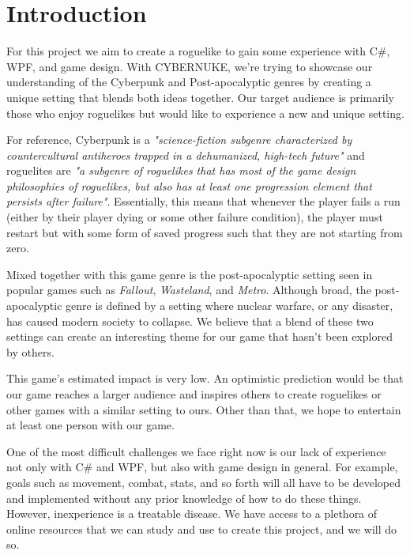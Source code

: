 \documentclass[10pt,conference,onecolumn,compsoc]{IEEEtran}
\begin{document}
\IEEEdisplaynontitleabstractindextext
\IEEEpeerreviewmaketitle



\section{Introduction}

For this project we aim to create a roguelike to gain some experience with C\#, WPF, and game design. With CYBERNUKE, we're trying to showcase our understanding of the Cyberpunk and Post-apocalyptic genres by creating a unique setting that blends both ideas together. Our target audience is primarily those who enjoy roguelikes but would like to experience a new  and unique setting. 

For reference, Cyberpunk is a \emph{"science-fiction subgenre characterized by countercultural antiheroes trapped in a dehumanized, high-tech future"}\cite{IEEEhowto:cyberpunk} and roguelites are \emph{"a subgenre of roguelikes that has most of the game design philosophies of roguelikes, but also has at least one progression element that persists after failure"}\cite{IEEEhowto:roguelite_1}. Essentially, this means that whenever the player fails a run (either by their player dying or some other failure condition), the player must restart but with some form of saved progress such that they are not starting from zero.

Mixed together with this game genre is the post-apocalyptic setting seen in popular games such as \emph{Fallout}, \emph{Wasteland}, and \emph{Metro}. Although broad, the post-apocalyptic genre is defined by a setting where nuclear warfare, or any disaster, has caused modern society to collapse. We believe that a blend of these two settings can create an interesting theme for our game that hasn't been explored by others.

This game's estimated impact is very low. An optimistic prediction would be that our game reaches a larger audience and inspires others to create roguelikes or other games with a similar setting to ours. Other than that, we hope to entertain at least one person with our game.

One of the most difficult challenges we face right now is our lack of experience not only with C\# and WPF, but also with game design in general. For example, goals such as movement, combat, stats, and so forth will all have to be developed and implemented without any prior knowledge of how to do these things. However, inexperience is a treatable disease. We have access to a plethora of online resources that we can study and use to create this project, and we will do so. 
\end{document}

